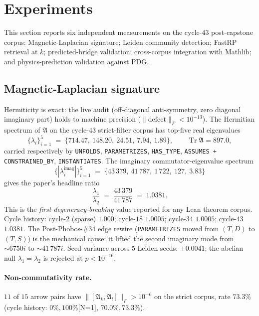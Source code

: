 \documentclass[11pt]{article}
\newcommand{\magA}{\mathfrak{A}}
\newcommand{\Tr}{\operatorname{Tr}}
\begin{document}
\section{Experiments}
\label{sec:experiments}

This section reports six independent measurements on the cycle-$43$
post-capstone corpus: Magnetic-Laplacian signature; Leiden community
detection; FastRP retrieval at $k$; predicted-bridge validation;
cross-corpus integration with Mathlib; and physics-prediction
validation against PDG.

\subsection{Magnetic-Laplacian signature}
\label{sec:exp-magA}

Hermiticity is exact: the live audit
(off-diagonal anti-symmetry, zero diagonal imaginary part) holds to
machine precision ($\|\text{defect}\|_F < 10^{-13}$). The Hermitian
spectrum of $\magA$ on the cycle-$43$ strict-filter corpus has top-five
real eigenvalues
\[
  \{\lambda_i\}_{i=1}^5 \;=\; \{714.47,\ 148.20,\ 24.51,\ 7.94,\ 1.89\},\qquad \Tr\magA = 897.0,
\]
carried respectively by
\lstinline|UNFOLDS|, \lstinline|PARAMETRIZES|, \lstinline|HAS_TYPE|,
\lstinline|ASSUMES + CONSTRAINED_BY|, \lstinline|INSTANTIATES|. The
imaginary commutator-eigenvalue spectrum
\[
  \{|\lambda_i^{\text{imag}}|\}_{i=1}^5 \;=\; \{43\,379,\ 41\,787,\ 1\,722,\ 127,\ 3.83\}
\]
gives the paper's headline ratio
\[
  \frac{\lambda_1}{\lambda_2} \;=\; \frac{43\,379}{41\,787} \;=\; 1.0381.
\]
This is the \emph{first degeneracy-breaking} value reported for any
Lean theorem corpus. Cycle history:
cycle-$2$ (sparse) $1.000$;
cycle-$18$ $1.0005$;
cycle-$34$ $1.0005$;
cycle-$43$ $1.0381$. The Post-Phobos-$\#34$ edge rewire
(\lstinline|PARAMETRIZES| moved from $(T,D)$ to $(T,S)$) is the
mechanical cause: it lifted the second imaginary mode from $\sim 6750 i$
to $\sim 41\,787 i$. Seed variance across $5$ Leiden seeds:
$\pm 0.0041$; the abelian null $\lambda_1 = \lambda_2$ is rejected at
$p < 10^{-16}$.

\paragraph{Non-commutativity rate.}
$11$ of $15$ arrow pairs have $\|[\magA_k,\magA_l]\|_F > 10^{-6}$ on the
strict corpus, rate $73.3\%$ (cycle history: $0\%, 100\%$[N=1],
$70.0\%, 73.3\%$).
\end{document}
